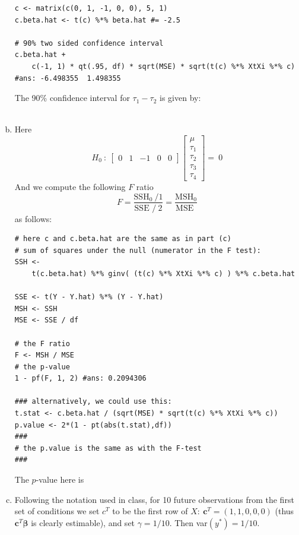\documentclass[paper=a4, fontsize=11pt]{scrartcl} %
\newcommand{\vecBeta}{\mathbf{\beta}}
\newcommand{\vecC}{\mathbf{c}}
\begin{document}
\begin{enumerate}[(a)]
 \begin{lstlisting}[basicstyle=\ttfamily\small\bfseries]
c <- matrix(c(0, 1, -1, 0, 0), 5, 1)
c.beta.hat <- t(c) %*% beta.hat #= -2.5

# 90% two sided confidence interval
c.beta.hat +
    c(-1, 1) * qt(.95, df) * sqrt(MSE) * sqrt(t(c) %*% XtXi %*% c)
#ans: -6.498355  1.498355
\end{lstlisting}

 The 90\% confidence interval for $\tau_1 - \tau_2$ is given by:
\\
 \\
 
 
 
\item Here
$$
H_0 \ : \ 
\begin{bmatrix} 0 & 1 & -1 & 0 & 0 
\end{bmatrix}
\begin{bmatrix} \mu\\
                             \tau_1\\
                             \tau_2\\
                             \tau_3\\
                             \tau_4
\end{bmatrix}
= \ 0
$$ 
And we compute the following $F$ ratio
$$
F = \frac{\text{SSH}_0 \ / 1 }{ \text{SSE }  / \ 2 } = \frac{\text{MSH}_0 }{ \text{MSE } } 
$$
as follows:
 \begin{lstlisting}[basicstyle=\ttfamily\small\bfseries]
# here c and c.beta.hat are the same as in part (c)
# sum of squares under the null (numerator in the F test):
SSH <- 
    t(c.beta.hat) %*% ginv( (t(c) %*% XtXi %*% c) ) %*% c.beta.hat

SSE <- t(Y - Y.hat) %*% (Y - Y.hat)
MSH <- SSH
MSE <- SSE / df

# the F ratio
F <- MSH / MSE
# the p-value
1 - pf(F, 1, 2) #ans: 0.2094306

### alternatively, we could use this: 
t.stat <- c.beta.hat / (sqrt(MSE) * sqrt(t(c) %*% XtXi %*% c))
p.value <- 2*(1 - pt(abs(t.stat),df))
###
# the p.value is the same as with the F-test
###
\end{lstlisting}

The $p$-value here is \ \\


\item Following the notation used in class, for 10 future observations from the first set of conditions 
we set $c^T$ to be the first row of $X: \ \vecC^T = (1, 1, 0, 0, 0)$ (thus $\vecC^T \vecBeta$ is 
clearly estimable), and set $\gamma = 1/10$.  Then var$(y^*) = 1/10$. \\


\end{enumerate}
\end{document}
